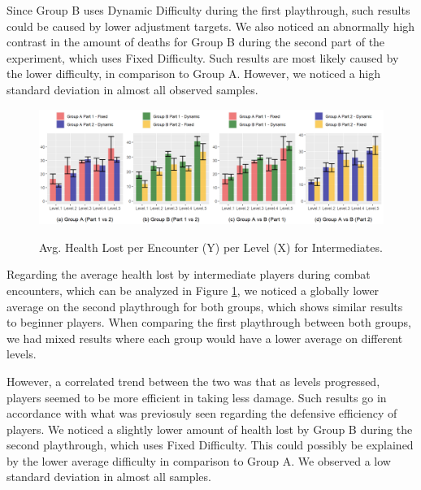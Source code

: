 Since Group B uses Dynamic Difficulty during the first playthrough, such results could be caused by lower adjustment targets. We also noticed an abnormally high contrast in the amount of deaths for Group B during the second part of the experiment, which uses Fixed Difficulty. Such results are most likely caused by the lower difficulty, in comparison to Group A. However, we noticed a high standard deviation in almost all observed samples.

\begin{figure}[!ht]
    \begin{center}
    \caption{Avg. Health Lost per Encounter (Y) per Level (X) for Intermediates.}
        \includegraphics[width=\textwidth]{figures/health_lost_per_encounter-intermediate_players.png}
        \label{fig:result-metric-intermediates-health-lost-per-encounter}
    \end{center}
\end{figure}

Regarding the average health lost by intermediate players during combat encounters, which can be analyzed in Figure \ref{fig:result-metric-intermediates-health-lost-per-encounter}, we noticed a globally lower average on the second playthrough for both groups, which shows similar results to beginner players. When comparing the first playthrough between both groups, we had mixed results where each group would have a lower average on different levels.

However, a correlated trend between the two was that as levels progressed, players seemed to be more efficient in taking less damage. Such results go in accordance with what was previosuly seen regarding the defensive efficiency of players. We noticed a slightly lower amount of health lost by Group B during the second playthrough, which uses Fixed Difficulty. This could possibly be explained by the lower average difficulty in comparison to Group A. We observed a low standard deviation in almost all samples.

